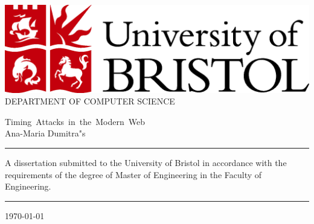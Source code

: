 \documentclass[10pt,a4paper,twoside]{book}
\begin{document}

 \newpage
  \thispagestyle{empty}


  \vspace*{\fill}
  \begin{center}
                \includegraphics[scale=0.3]{logo/logo_uob_color}                \\
                              \vspace*{1.0cm}
                          DEPARTMENT OF COMPUTER SCIENCE                        \\
                              \vspace*{2.0cm}
                       
 				 \mbox{{\LARGE Timing Attacks in the Modern Web}} \\
                              \vspace*{0.5cm}
                              \vspace*{1.0cm}
                          {\Large Ana-Maria Dumitra"s}                         \\

                              \vspace*{1.0cm}
                          \rule{0.5\textwidth}{0.5pt}
                              \vspace*{1.0cm}

            A dissertation submitted to the University of Bristol
            in accordance with the requirements of the degree of
            Master   of Engineering
                    in the Faculty of Engineering.                                

                              \vspace*{1.0cm}
                          \rule{0.5\textwidth}{0.5pt}
                              \vspace*{1.0cm}

                                  \today
  \end{center}
  \vspace*{\fill}
  
\end{document}
